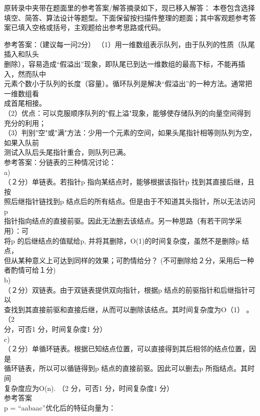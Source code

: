 \begin{question}
\begin{solution}
\medskip
\noindent 原转录中夹带在题面里的参考答案/解答摘录如下，现已移入解答：
本卷包含选择填空、简答、算法设计等题型。下面保留按扫描件整理的题面；其中客观题参考答案已填入空格或括号，主观题给出参考思路或代码。

参考答案：（建议每一问2分） （1）用一维数组表示队列，由于队列的性质（队尾插入和队头\\
删除），容易造成“假溢出”现象，即队尾已到达一维数组的最高下标，不能再插入，然而队中\\
元素个数小于队列的长度（容量）。循环队列是解决“假溢出”的一种方法。通常把一维数组看\\
成首尾相接。\\
（2）优点：可以克服顺序队列的"假上溢"现象，能够使存储队列的向量空间得到充分的利用；\\
（3）判别"空"或"满"方法：少用一个元素的空间，如果头尾指针相等则队列为空，如果入队前\\
测试入队后头尾指针重合，则队列已满。\\
参考答案：分链表的三种情况讨论：\\
a)\\
（２分）单链表。若指针p 指向某结点时，能够根据该指针p 找到其直接后继，且按\\
照后继指针链找到p 结点后的所有结点。但是由于不知道其头指针，所以无法访问p\\
指针指向结点的直接前驱。因此无法删去该结点。另一种思路（有若干同学采用）：可\\
将p 的后继结点的值赋给p, 并将其删除，O(1)的时间复杂度，虽然不是删除p 结点，\\
但从某种意义上可达到同样的效果；可酌情给分？   (不可删除给２分，采用后一种\\
者酌情可给１分)\\
b)\\
（２分）双链表。由于双链表提供双向指针，根据p 结点的前驱指针和后继指针可以\\
查找到其直接前驱和直接后继，从而可以删除该结点。其时间复杂度为O（1） 。（2\\
分，可否1 分，时间复杂度1 分）\\
c)\\
（２分）单循环链表。根据已知结点位置，可以直接得到其后相邻的结点位置，因是\\
循环链表，所以可以循链得到p 结点的直接前驱。因此可以删去p 所指结点。其时间\\
复杂度应为O(n). （2 分，可否1 分，时间复杂度1 分）\\
参考答案\\
p = “aabaac”优化后的特征向量为：\\

\end{solution}
\end{question}
